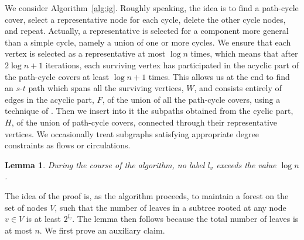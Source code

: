 \documentclass[11pt]{article}
\newtheorem{lemma}[theorem]{Lemma}
\begin{document}
We consider Algorithm~\ref{alg:ig}. Roughly speaking, the idea is to find a path-cycle cover, select a representative node for each cycle, delete the other cycle nodes, and repeat. Actually, a representative is selected for a component more general than a simple cycle, namely a union of one or more cycles. We ensure that each vertex is selected as a representative at most $\log n$ times, which means that after $2 \log n +1$ iterations, each surviving vertex has participated in the acyclic part of the path-cycle covers at least $\log n +1$ times. This allows us at the end to find an $s$-$t$ path which spans all the surviving vertices, $W$, and consists entirely of edges in the acyclic part, $F$, of the union of all the path-cycle covers, using a technique of \cite{nagarajan:ravi:latency}. Then we insert into it the subpaths obtained from the cyclic part, $H$, of the union of path-cycle covers, connected through their representative vertices. 
We occasionally treat subgraphs satisfying appropriate degree constraints as flows or circulations.



\begin{lemma} \label{lem:label}
During the course of the algorithm, no label $l_v$ exceeds the value $\log n$.
\end{lemma}

The idea of the proof is, as the algorithm proceeds, to maintain a forest on the set of nodes $V$, such that the number of leaves in a subtree rooted at any node $v\in V$ is at least $2^{l_v}$. The lemma then follows because the total number of leaves is at most $n$. 
We first prove an auxiliary claim.
\end{document}
